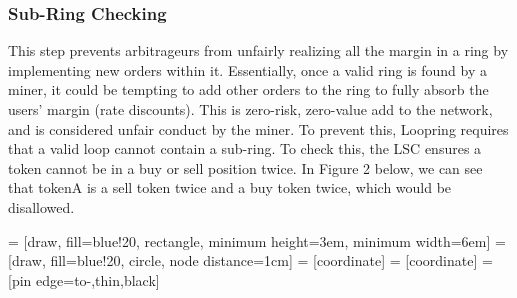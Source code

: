 \documentclass[UTF8,nofonts]{article}
\makeatletter
\newenvironment{figurehere}
 {\def\@captype{figure}}
 {}
\makeatother
\begin{document}
\begin{multicols}{2}
\subsubsection{Sub-Ring Checking\label{sec:sub_ring_check}}
This step prevents arbitrageurs from unfairly realizing all the margin in a ring by implementing new orders within it. Essentially, once a valid ring is found by a miner, it could be tempting to add other orders to the ring to fully absorb the users' margin (rate discounts). This is zero-risk, zero-value add to the network, and is considered unfair conduct by the miner. To prevent this, Loopring requires that a valid loop cannot contain a sub-ring. To check this, the LSC ensures a token cannot be in a buy or sell position twice. In Figure 2 below, we can see that tokenA is a sell token twice and a buy token twice, which would be disallowed. 

\begin{center}
\begin{figurehere}
\centering
{} = [draw, fill=blue!20, rectangle, 
    minimum height=3em, minimum width=6em]
 = [draw, fill=blue!20, circle, node distance=1cm]
 = [coordinate]
 = [coordinate]
 = [pin edge={to-,thin,black}]

\end{figurehere}
\end{center}
\end{multicols}
\end{document}
